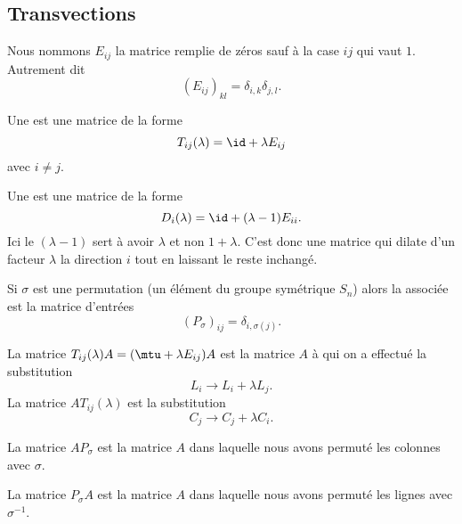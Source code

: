 \subsection{Transvections}

Nous nommons \( E_{ij}\) la matrice remplie de zéros sauf à la case \( ij\) qui vaut \( 1\). Autrement dit
\begin{equation}
	(E_{ij})_{kl}=\delta_{i,k}\delta_{j,l}.
\end{equation}
\begin{definition}
	Une  est une matrice de la forme
	\begin{equation}
		T_{ij}(\lambda)=\id+\lambda E_{ij}
	\end{equation}
	avec \( i\neq j\).

	Une  est une matrice de la forme
	\begin{equation}
		D_i(\lambda)=\id+(\lambda-1)E_{ii}.
	\end{equation}
	Ici le \( (\lambda-1)\) sert à avoir \( \lambda\) et non \( 1+\lambda\). C'est donc une matrice qui dilate d'un facteur \( \lambda\) la direction \( i\) tout en laissant le reste inchangé.

	Si \( \sigma\) est une permutation (un élément du groupe symétrique \( S_n\)) alors la  associée est la matrice d'entrées
	\begin{equation}
		(P_{\sigma})_{ij}=\delta_{i,\sigma(j)}.
	\end{equation}
\end{definition}

\begin{lemma}   \label{LemyrAXQs}
	La matrice \( T_{ij}(\lambda)A=(\mtu+\lambda E_{ij})A\) est la matrice \( A\) à qui on a effectué la substitution
	\begin{equation}
		L_i\to L_i+\lambda L_j.
	\end{equation}
	La matrice \( AT_{ij}(\lambda)\) est la substitution
	\begin{equation}
		C_j\to C_j+\lambda C_i.
	\end{equation}

	La matrice \( AP_{\sigma}\) est la matrice \( A\) dans laquelle nous avons permuté les colonnes avec \( \sigma\).

	La matrice \( P_{\sigma}A\) est la matrice \( A\) dans laquelle nous avons permuté les lignes avec \( \sigma^{-1}\).
\end{lemma}

